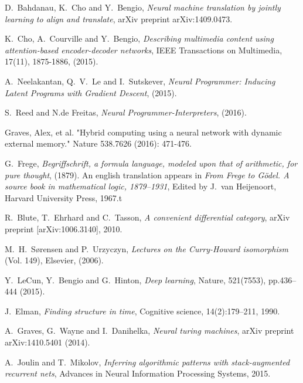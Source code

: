 \documentclass[english,letter paper,12pt,leqno]{article}
\theoremstyle{example}
\numberwithin{equation}{section}
\begin{document}

\providecommand{\bysame}{\leavevmode\hbox to3em{\hrulefill}\thinspace}
\providecommand{\href}[2]{#2}
\begin{thebibliography}{BHLS03}

D.~Bahdanau, K.~Cho and Y.~Bengio, \textsl{Neural machine translation by jointly learning to align and translate}, arXiv preprint arXiv:1409.0473.

K.~Cho, A.~Courville and Y.~Bengio, \textsl{Describing multimedia content using attention-based encoder-decoder networks}, IEEE Transactions on Multimedia, 17(11), 1875-1886, (2015).

A.~Neelakantan, Q.~V.~Le and I.~Sutskever, \textsl{Neural Programmer: Inducing Latent Programs with Gradient Descent}, (2015).

S.~Reed and N.de Freitas, \textsl{Neural Programmer-Interpreters}, (2016).

Graves, Alex, et al. "Hybrid computing using a neural network with dynamic external memory." Nature 538.7626 (2016): 471-476.

G.~Frege, \textsl{Begriffschrift, a formula language, modeled upon that of arithmetic, for pure thought}, (1879). An english translation appears in \textsl{From Frege to G\"odel. A source book in mathematical logic, 1879--1931}, Edited by J.~van Heijenoort, Harvard University Press, 1967.t

R.~Blute, T.~Ehrhard and C.~Tasson, \textsl{A convenient differential category}, arXiv preprint \href{https://arxiv.org/abs/1006.3140}{[arXiv:1006.3140]}, 2010.

M.~H.~S\o rensen and P.~Urzyczyn, \textsl{Lectures on the Curry-Howard isomorphism} (Vol. 149), Elsevier, (2006).

Y.~LeCun, Y.~Bengio and G.~Hinton, \textsl{Deep learning},  Nature, 521(7553), pp.436--444 (2015).

J.~Elman, \textsl{Finding structure in time}, Cognitive science, 14(2):179–211, 1990.

A.~Graves, G.~Wayne and I.~Danihelka, \textsl{Neural turing machines}, arXiv preprint arXiv:1410.5401 (2014).

A.~Joulin and T.~Mikolov, \textsl{Inferring algorithmic patterns with stack-augmented recurrent nets}, Advances in Neural Information Processing Systems, 2015.


\end{thebibliography}
\end{document}
